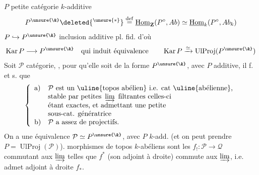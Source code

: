 



$P$ petite catégorie $k$-additive
\[
P^{\unsure{\&}}\deleted{{}^{\unsure{*}}}\mathrel{\mathop=^{\rm def}}
\underline{\mathrm{Hom}}_{\mathbf Z}(P^\circ,Ab)\simeq
\underline{\mathrm{Hom}}_k(P^\circ,Ab_k)
\]
$P\hookrightarrow P^{\unsure{\&}}$ inclusion additive pl. fid. d'où
\[
\operatorname{Kar}P\longrightarrow P^{\unsure{\&}}
\quad\text{qui induit équivalence}\qquad
\operatorname{Kar}P\xrightarrow{\simeq}\operatorname{UlProj}(P^{\unsure{\&}})
\]
Soit $\mathcal P$ catégorie, , pour qu'elle soit
 de la forme $P^{\unsure{\&}}$, avec $P$ additive,
il f. et s. que
\[
\left\{\begin{array}{ll}
\text{a)}&\mathcal P\text{ est un \uline{topos abélien} i.e. cat \uline{abélienne},}\\
&\text{stable par petites }\varinjlim\text{ filtrantes celles-ci}\\
&\text{étant exactes, et admettant une petite}\\
&\text{sous-cat. génératrice}\\
\text{b)}&\mathcal P\text{ a assez de projectifs.}
\end{array}\right.
\]
 
On a une équivalence $\mathcal P\simeq P^{\unsure{\&}}$,
avec $P$ $k$-add.
(et on peut prendre $P=\operatorname{UlProj}(\mathcal P)$).
morphismes de topos $k$-abéliens 
sont les $f_!:\mathcal P\longrightarrow\mathcal Q$ commutant aux $\varinjlim$
telles que $f^*$  (son adjoint à droite) commute
aux $\varinjlim$, i.e. admet adjoint à droite $f_*$.

